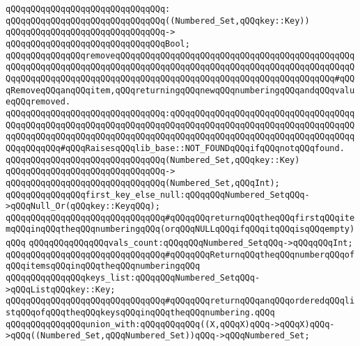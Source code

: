 \verb|qQQqqQQqqQQqqQQqqQQqqQQqqQQqqQQq:|\newline
\verb|qQQqqQQqqQQqqQQqqQQqqQQqqQQqqQQq((Numbered_Set,qQQqkey::Key))|\newline
\verb|qQQqqQQqqQQqqQQqqQQqqQQqqQQqqQQq->|\newline
\verb|qQQqqQQqqQQqqQQqqQQqqQQqqQQqqQQqBool;|\newline
\newline
\verb|qQQqqQQqqQQqqQQqremoveqQQqqQQqqQQqqQQqqQQqqQQqqQQqqQQqqQQqqQQqqQQqqQQqqQQqqQQqqQQqqQQqqQQqqQQqqQQqqQQqqQQqqQQqqQQqqQQqqQQqqQQqqQQqqQQqqQQqqQQqqQQqqQQqqQQqqQQqqQQqqQQqqQQqqQQqqQQqqQQqqQQqqQQqqQQqqQQqqQQqqQQq#qQQqRemoveqQQqanqQQqitem,qQQqreturningqQQqnewqQQqnumberingqQQqandqQQqvalueqQQqremoved.|\newline
\verb|qQQqqQQqqQQqqQQqqQQqqQQqqQQqqQQq:qQQqqQQqqQQqqQQqqQQqqQQqqQQqqQQqqQQqqQQqqQQqqQQqqQQqqQQqqQQqqQQqqQQqqQQqqQQqqQQqqQQqqQQqqQQqqQQqqQQqqQQqqQQqqQQqqQQqqQQqqQQqqQQqqQQqqQQqqQQqqQQqqQQqqQQqqQQqqQQqqQQqqQQqqQQqqQQqqQQqqQQqqQQq#qQQqRaisesqQQqlib_base::NOT_FOUNDqQQqifqQQqnotqQQqfound.|\newline
\verb|qQQqqQQqqQQqqQQqqQQqqQQqqQQqqQQq(Numbered_Set,qQQqkey::Key)|\newline
\verb|qQQqqQQqqQQqqQQqqQQqqQQqqQQqqQQq->|\newline
\verb|qQQqqQQqqQQqqQQqqQQqqQQqqQQqqQQq(Numbered_Set,qQQqInt);|\newline
\newline
\verb|qQQqqQQqqQQqqQQqfirst_key_else_null:qQQqqQQqNumbered_SetqQQq->qQQqNull_Or(qQQqkey::KeyqQQq);|\newline
\verb|qQQqqQQqqQQqqQQqqQQqqQQqqQQqqQQq#qQQqqQQqreturnqQQqtheqQQqfirstqQQqitemqQQqinqQQqtheqQQqnumberingqQQq(orqQQqNULLqQQqifqQQqitqQQqisqQQqempty)qQQq|\newline
\newline
\verb|qQQqqQQqqQQqqQQqvals_count:qQQqqQQqNumbered_SetqQQq->qQQqqQQqInt;|\newline
\verb|qQQqqQQqqQQqqQQqqQQqqQQqqQQqqQQq#qQQqqQQqReturnqQQqtheqQQqnumberqQQqofqQQqitemsqQQqinqQQqtheqQQqnumberingqQQq|\newline
\newline
\verb|qQQqqQQqqQQqqQQqkeys_list:qQQqqQQqNumbered_SetqQQq->qQQqListqQQqkey::Key;|\newline
\verb|qQQqqQQqqQQqqQQqqQQqqQQqqQQqqQQq#qQQqqQQqreturnqQQqanqQQqorderedqQQqlistqQQqofqQQqtheqQQqkeysqQQqinqQQqtheqQQqnumbering.qQQq|\newline
\newline
\verb|qQQqqQQqqQQqqQQqunion_with:qQQqqQQqqQQq((X,qQQqX)qQQq->qQQqX)qQQq->qQQq((Numbered_Set,qQQqNumbered_Set))qQQq->qQQqNumbered_Set;|\newline
